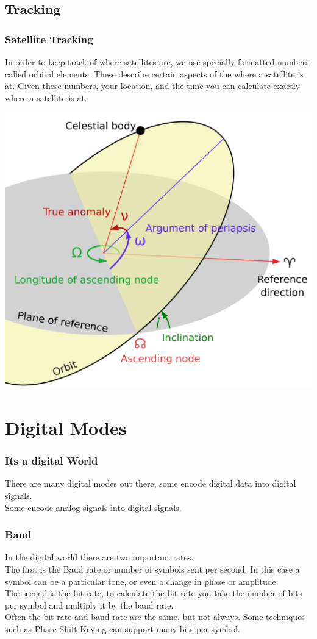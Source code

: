 \documentclass[10pt]{beamer}
\begin{document}
\subsection{Tracking}
\begin{frame}
\frametitle{Satellite Tracking}
In order to keep track of where satellites are, we use specially formatted numbers called orbital elements. These describe certain aspects of the where a satellite is at. Given these numbers, your location, and the time you can calculate exactly where a satellite is at.
\begin{center}
\includegraphics[height=.5\textheight]{orbitelements.png}
\end{center}
\end{frame}

\section{Digital Modes}
\begin{frame}
\frametitle{Its a digital World}
There are many digital modes out there, some encode digital data into digital signals.\\
Some encode analog signals into digital signals.
\end{frame}

\begin{frame}
\frametitle{Baud}
In the digital world there are two important rates.\\
The first is the Baud rate or number of symbols sent per second. In this case a symbol can be a particular tone, or even a change in phase or amplitude.\\
The second is the bit rate, to calculate the bit rate you take the number of bits per symbol and multiply it by the baud rate.\\
Often the bit rate and baud rate are the same, but not always. Some techniques such as Phase Shift Keying can support many bits per symbol.
\end{frame}
\end{document}
